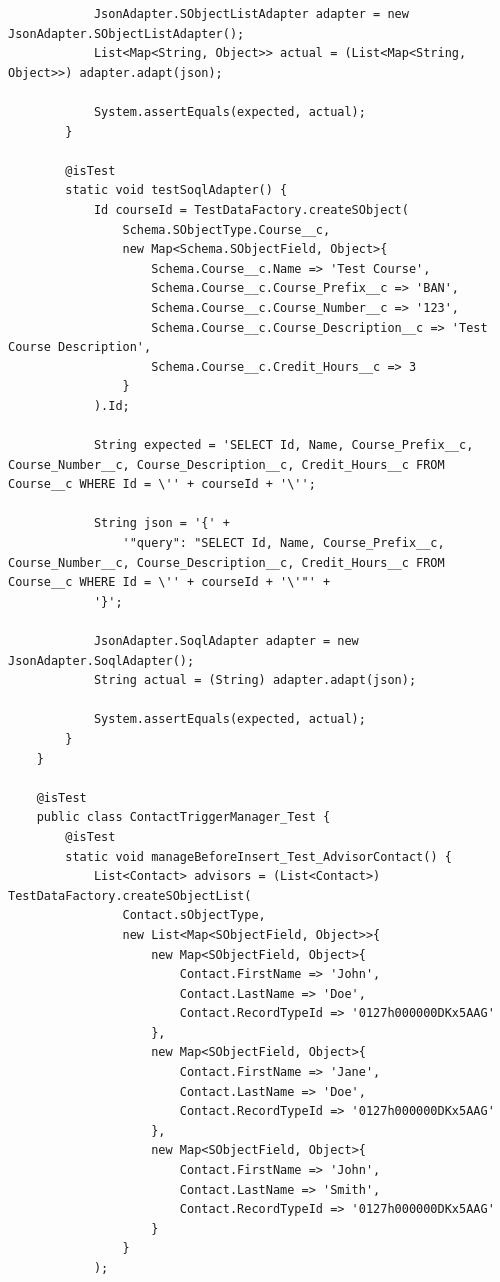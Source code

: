 \documentclass[12pt]{article}
\begin{document}
\begin{lstlisting}
            JsonAdapter.SObjectListAdapter adapter = new JsonAdapter.SObjectListAdapter();
            List<Map<String, Object>> actual = (List<Map<String, Object>>) adapter.adapt(json);
    
            System.assertEquals(expected, actual);
        }
    
        @isTest
        static void testSoqlAdapter() {
            Id courseId = TestDataFactory.createSObject(
                Schema.SObjectType.Course__c,
                new Map<Schema.SObjectField, Object>{
                    Schema.Course__c.Name => 'Test Course',
                    Schema.Course__c.Course_Prefix__c => 'BAN',
                    Schema.Course__c.Course_Number__c => '123',
                    Schema.Course__c.Course_Description__c => 'Test Course Description',
                    Schema.Course__c.Credit_Hours__c => 3
                }
            ).Id;
    
            String expected = 'SELECT Id, Name, Course_Prefix__c, Course_Number__c, Course_Description__c, Credit_Hours__c FROM Course__c WHERE Id = \'' + courseId + '\'';
    
            String json = '{' +
                '"query": "SELECT Id, Name, Course_Prefix__c, Course_Number__c, Course_Description__c, Credit_Hours__c FROM Course__c WHERE Id = \'' + courseId + '\'"' +
            '}';
    
            JsonAdapter.SoqlAdapter adapter = new JsonAdapter.SoqlAdapter();
            String actual = (String) adapter.adapt(json);
    
            System.assertEquals(expected, actual);
        }
    }
    
    @isTest
    public class ContactTriggerManager_Test {
        @isTest
        static void manageBeforeInsert_Test_AdvisorContact() {
            List<Contact> advisors = (List<Contact>) TestDataFactory.createSObjectList(
                Contact.sObjectType,
                new List<Map<SObjectField, Object>>{
                    new Map<SObjectField, Object>{
                        Contact.FirstName => 'John',
                        Contact.LastName => 'Doe',
                        Contact.RecordTypeId => '0127h000000DKx5AAG'
                    },
                    new Map<SObjectField, Object>{
                        Contact.FirstName => 'Jane',
                        Contact.LastName => 'Doe',
                        Contact.RecordTypeId => '0127h000000DKx5AAG'
                    },
                    new Map<SObjectField, Object>{
                        Contact.FirstName => 'John',
                        Contact.LastName => 'Smith',
                        Contact.RecordTypeId => '0127h000000DKx5AAG'
                    }
                }
            );
    

\end{lstlisting}
\end{document}
